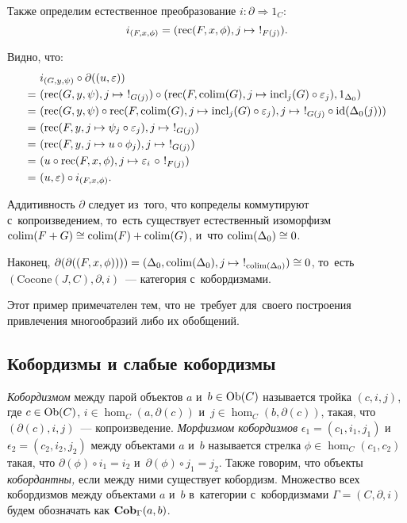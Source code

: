 \documentclass[a4paper,oneside]{article}
\begin{document}
Также определим естественное преобразование $i : \partial \Rightarrow 1_C$:
$$
    i_{(F, x, \phi)} = (\mathrm{rec}(F, x, \phi), j \mapsto\ !_{F(j)}).
$$

Видно, что:
\begin{align*}
    \phantom{=}&\ i_{(G, y, \psi)} \circ \partial((u, \varepsilon)) \\
              =&\ (\rec(G, y, \psi), j \mapsto\ !_{G(j)}) \circ (\rec(F, \colim(G), j \mapsto \incl_j(G) \circ \varepsilon_j), 1_{\Delta_0}) \\
              =&\ (\rec(G, y, \psi) \circ \rec(F, \colim(G), j \mapsto \incl_j(G) \circ \varepsilon_j), j \mapsto\ !_{G(j)} \circ \id(\Delta_0(j))) \\
              =&\ (\rec(F, y, j \mapsto \psi_j \circ \varepsilon_j), j \mapsto\ !_{G(j)}) \\
              =&\ (\rec(F, y, j \mapsto u \circ \phi_j), j \mapsto\ !_{G(j)}) \\
              =&\ (u \circ \rec(F, x, \phi), j \mapsto \varepsilon_i\ \circ\ !_{F(j)}) \\
              =&\ (u, \varepsilon) \circ i_{(F, x, \phi)}.
\end{align*}

Аддитивность $\partial$ следует из~того, что копределы коммутируют с~копроизведением,
то~есть существует естественный изоморфизм $\mathrm{colim}(F + G) \cong \mathrm{colim}(F) + \mathrm{colim}(G)$,
и~что $\mathrm{colim}(\Delta_0) \cong 0$.

Наконец, $\partial(\partial((F, x, \phi)))) = (\Delta_0, \mathrm{colim}(\Delta_0), j \mapsto\ !_{\mathrm{colim}(\Delta_0)}) \cong 0$,
то~есть $(\mathrm{Cocone}(J, C), \partial, i)$~— категория с~кобордизмами.

Этот пример примечателен тем, что не~требует для~своего построения привлечения многообразий либо их обобщений.

\subsection{Кобордизмы и слабые кобордизмы}

\textit{Кобордизмом} между парой объектов $a$ и~$b \in \mathrm{Ob}(C)$ называется тройка $(c, i, j)$,
где $c \in \mathrm{Ob}(C)$, $i \in \hom_C(a, \partial(c))$ и~$j \in \hom_C(b, \partial(c))$,
такая, что $(\partial(c), i, j)$~— копроизведение. \textit{Морфизмом кобордизмов} $\epsilon_1 = (c_1, i_1, j_1)$
и~$\epsilon_2 = (c_2, i_2, j_2)$ между объектами $a$ и~$b$ называется стрелка $\phi \in \hom_C(c_1, c_2)$
такая, что $\partial(\phi) \circ i_1 = i_2$ и~$\partial(\phi) \circ j_1 = j_2$. Также говорим, что объекты \textit{кобордантны,}
если между ними существует кобордизм. Множество всех кобордизмов между объектами $a$ и~$b$ в~категории с~кобордизмами
$\Gamma = (C, \partial, i)$ будем обозначать как $\mathbf{Cob}_\Gamma(a, b)$.
\end{document}
